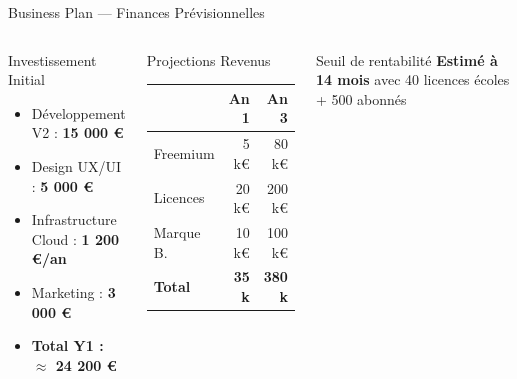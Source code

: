 \documentclass[aspectratio=169,12pt]{beamer}
\begin{document}
\begin{frame}{Business Plan --- Finances Pr\'evisionnelles}
  \begin{columns}
    \begin{block}{Investissement Initial}
      \begin{itemize}
        \item D\'eveloppement V2 : \textbf{15 000 \euro}
        \item Design UX/UI : \textbf{5 000 \euro}
        \item Infrastructure Cloud : \textbf{1 200 \euro/an}
        \item Marketing : \textbf{3 000 \euro}
        \item \textbf{Total Y1 : $\approx$ 24 200 \euro}
      \end{itemize}
    \end{block}
    \begin{exampleblock}{Projections Revenus}
      \begin{tabular}{lrr}
        \toprule
        & \textbf{An 1} & \textbf{An 3}\\
        \midrule
        Freemium & 5 k\euro & 80 k\euro\\
        Licences & 20 k\euro & 200 k\euro\\
        Marque B. & 10 k\euro & 100 k\euro\\
        \midrule
        \textbf{Total} & \textbf{35 k} & \textbf{380 k}\\
        \bottomrule
      \end{tabular}
    \end{exampleblock}
    \begin{alertblock}{Seuil de rentabilit\'e}
      \textbf{Estim\'e \`a 14 mois} avec 40 licences \'ecoles + 500 abonn\'es
    \end{alertblock}
  \end{columns}
\end{frame}
\end{document}
